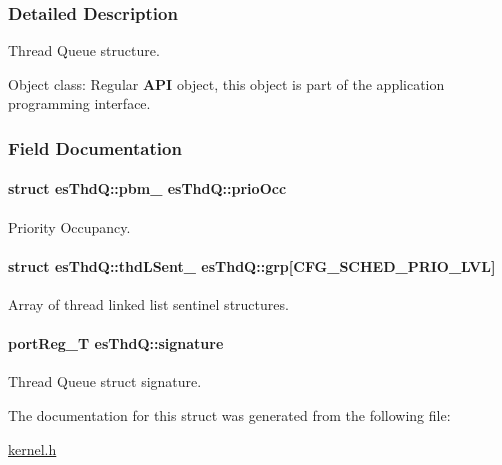 \subsubsection{Detailed Description}
Thread Queue structure. 

\begin{DoxyParagraph}{Object class\-:}
Regular {\bfseries A\-P\-I} object, this object is part of the application programming interface. 
\end{DoxyParagraph}


\subsubsection{Field Documentation}
\hypertarget{structesThdQ_a3ded234a55356bb708c55339d8438b0a}{
\paragraph[{prio\-Occ}]{\setlength{\rightskip}{0pt plus 5cm}struct {\bf es\-Thd\-Q\-::pbm\-\_\-}                es\-Thd\-Q\-::prio\-Occ}}\label{structesThdQ_a3ded234a55356bb708c55339d8438b0a}


Priority Occupancy. 

\hypertarget{structesThdQ_ac658d22a97cdceefa9d72c3e9e1a675e}{
\paragraph[{grp}]{\setlength{\rightskip}{0pt plus 5cm}struct {\bf es\-Thd\-Q\-::thd\-L\-Sent\-\_\-}                es\-Thd\-Q\-::grp\mbox{[}{\bf C\-F\-G\-\_\-\-S\-C\-H\-E\-D\-\_\-\-P\-R\-I\-O\-\_\-\-L\-V\-L}\mbox{]}}}\label{structesThdQ_ac658d22a97cdceefa9d72c3e9e1a675e}


Array of thread linked list sentinel structures. 

\hypertarget{structesThdQ_a2756407c94319267cbf5d30814182b4d}{
\paragraph[{signature}]{\setlength{\rightskip}{0pt plus 5cm}port\-Reg\-\_\-\-T es\-Thd\-Q\-::signature}}\label{structesThdQ_a2756407c94319267cbf5d30814182b4d}


Thread Queue struct signature. 



The documentation for this struct was generated from the following file\-:\begin{DoxyCompactItemize}
\item 
\hyperlink{kernel_8h}{kernel.\-h}\end{DoxyCompactItemize}

